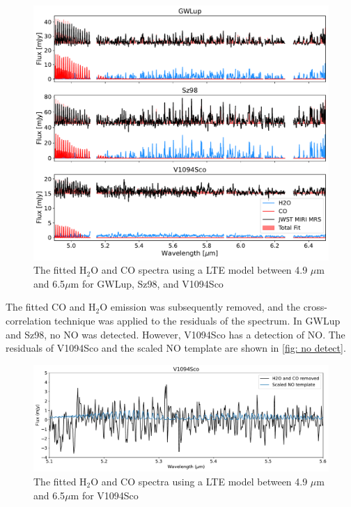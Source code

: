 \documentclass[oneside, single, authoryear, semicolon, 12pt]{lion-msc}
\newcommand{\4}{$_4$}
\newcommand{\3}{$_3$}
\newcommand{\2}{$_2$}
\begin{document}
\begin{figure}[H]
    \centering
    \includegraphics[width=\linewidth]{Figures/Fits.pdf}
    \caption{The fitted H\2O and CO spectra using a LTE model between 4.9 $\mu$m and 6.5$\mu$m for GWLup, Sz98, and V1094Sco}
    \label{fig: fits}
\end{figure}

The fitted CO and H\2O emission was subsequently removed, and the cross-correlation technique was applied to the residuals of the spectrum. In GWLup and Sz98, no NO was detected. However, V1094Sco has a detection of NO. The residuals of V1094Sco and the scaled NO template are shown in \autoref{fig: no detect}. 
\begin{figure}[H]
    \centering
    \includegraphics[width=\linewidth]{Figures/NO_Detect.pdf}
    \caption{The fitted H\2O and CO spectra using a LTE model between 4.9 $\mu$m and 6.5$\mu$m for V1094Sco}
    \label{fig: no detect}
\end{figure}
\end{document}
